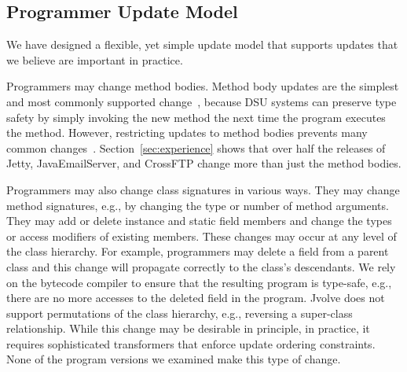 \documentclass[9pt]{sigplanconf}
\newcommand{\DSU}{{\sc Jvolve}}
\begin{document}

\subsection{Programmer Update Model}
\label{sec:updates}

We have designed a flexible, yet simple update model that supports
updates that we believe are important in practice. 

Programmers may
change method bodies. Method body updates are the simplest and most
commonly supported
change~\cite{JVMhotswap, VSEnC, eaddy05enc, GilmoreKW97, orso:java,
  K42reconfig, HjalmtyssonG98},
because DSU systems can preserve type safety by simply invoking the new
method the next time the program executes the method.  However,
restricting updates to method bodies prevents many common
changes~\cite{neamtiu05evolution}.  Section~\ref{sec:experience} shows
that over half the releases of Jetty, JavaEmailServer, and CrossFTP
change more than just the method bodies.

Programmers may also change class signatures in various ways.
They may change method signatures, e.g., by changing the type or
number of method arguments.  They may add or delete instance and
static field members and change the types or access modifiers of
existing members.
These changes may occur at any level of the class hierarchy.  For
example, programmers may delete 
a field from a parent class and this change will propagate correctly
to the class's descendants. We rely on the bytecode compiler to ensure that the resulting program is type-safe, e.g., there are no more accesses to the deleted field in the program.  
\DSU{} does not support permutations of the
class hierarchy, e.g., reversing a super-class relationship.  While
this change may be desirable in principle, in practice, it requires
sophisticated transformers that enforce update ordering
constraints. None of the program versions we examined make this type
of change.
\end{document}
